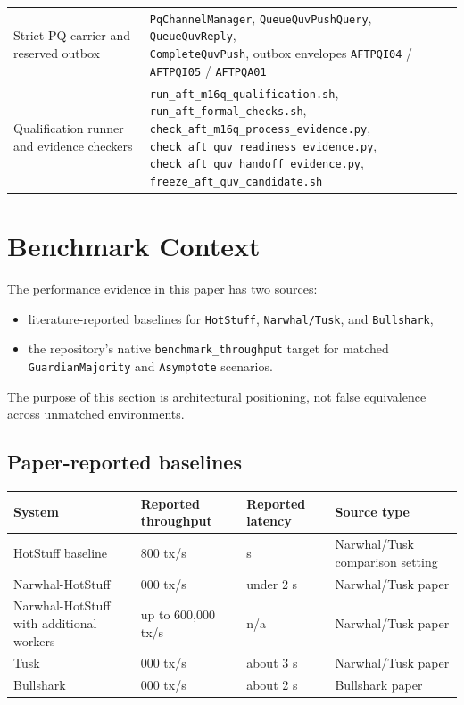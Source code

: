 \documentclass[11pt]{article}
\newcommand{\code}[1]{\texttt{#1}}
\begin{document}
\begin{center}
\begin{tabularx}{\textwidth}{>{\raggedright\arraybackslash}p{} X}
Strict PQ carrier and reserved outbox & \shortstack[l]{\code{PqChannelManager}, \code{QueueQuvPushQuery}, \code{QueueQuvReply},\\\code{CompleteQuvPush}, outbox envelopes \code{AFTPQI04} / \code{AFTPQI05} / \code{AFTPQA01}} \\
Qualification runner and evidence checkers & \shortstack[l]{\code{run\_aft\_m16q\_qualification.sh}, \code{run\_aft\_formal\_checks.sh},\\\code{check\_aft\_m16q\_process\_evidence.py}, \code{check\_aft\_quv\_readiness\_evidence.py},\\\code{check\_aft\_quv\_handoff\_evidence.py}, \code{freeze\_aft\_quv\_candidate.sh}} \\
\bottomrule
\end{tabularx}
\end{center}


\section{Benchmark Context}

The performance evidence in this paper has two sources:

\begin{itemize}[leftmargin=1.5em]
\item literature-reported baselines for \code{HotStuff}, \code{Narwhal/Tusk},
and \code{Bullshark},
\item the repository's native \code{benchmark\_throughput} target for matched
\code{GuardianMajority} and \code{Asymptote} scenarios.
\end{itemize}

The purpose of this section is architectural positioning, not false
equivalence across unmatched environments.

\subsection{Paper-reported baselines}

\begin{center}
\small
\begin{tabularx}{\textwidth}{>{\raggedright\arraybackslash}p{} >{\raggedleft\arraybackslash}p{} >{\raggedleft\arraybackslash}p{} X}
\toprule
\textbf{System} & \textbf{Reported throughput} & \textbf{Reported latency} & \textbf{Source type} \\
\midrule
HotStuff baseline & 1{,}800 tx/s & 1 s & Narwhal/Tusk comparison setting \\
Narwhal-HotStuff & 130{,}000 tx/s & under 2 s & Narwhal/Tusk paper \\
Narwhal-HotStuff with additional workers & up to 600{,}000 tx/s & n/a & Narwhal/Tusk paper \\
Tusk & 160{,}000 tx/s & about 3 s & Narwhal/Tusk paper \\
Bullshark & 125{,}000 tx/s & about 2 s & Bullshark paper \\
\bottomrule
\end{tabularx}
\end{center}
\end{document}
